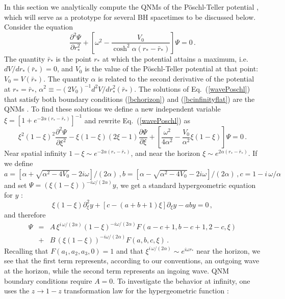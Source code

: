 \documentclass[]{iopart}
\def\be{\begin{equation}}
\def\ee{\end{equation}}
\begin{document}
In this section we analytically compute the QNMs of the P\"oschl-Teller
potential \cite{poschlteller,Ferrari:1984zz}, which will serve as a prototype
for several BH spacetimes to be discussed below. Consider the equation
%
\be \frac{\partial^{2} \Psi}{\partial r_*^2} +
\left\lbrack\omega^2-\frac{V_0}{\cosh^2{\alpha(
r_*-\bar{r}_*)}}\right\rbrack \Psi=0 \,. \label{wavePoschl} \ee
%
The quantity $\bar{r}_*$ is the point $r_*$ at which the potential attains a
maximum, i.e. $dV/dr_*(\bar{r}_*)=0$, and $V_0$ is the value of the
P\"oschl-Teller potential at that point: $V_0=V(\bar{r}_*)$. The quantity
$\alpha$ is related to the second derivative of the potential at
$r_*=\bar{r}_*$, $\alpha^2\equiv -(2V_0)^{-1} d^2V/dr_*^2(\bar{r}_*)$.
%
The solutions of Eq.~(\ref{wavePoschl}) that satisfy both boundary conditions
(\ref{bchorizon}) and (\ref{bcinfinityflat}) are the QNMs
\cite{Ferrari:1984zz}. To find these solutions we define a new independent
variable
%
$\xi=\left[1+e^{-2\alpha(r_*-\bar{r}_*)}\right]^{-1}$ and rewrite
Eq.~(\ref{wavePoschl}) as
%
\be \xi^2(1-\xi)^2\frac{\partial^{2} \Psi}{\partial
\xi^2}- \xi(1-\xi) (2\xi-1)\frac{\partial \Psi}{\partial
\xi} + \left\lbrack \frac{\omega^2}{4\alpha^2 }-\frac{V_0}{\alpha^2 }\xi (1-\xi)\right\rbrack \Psi=0
\,. \ee
%
Near spatial infinity $1-\xi \sim e^{-2\alpha(r_*-\bar{r}_*)}$, and near the
horizon $\xi \sim e^{2\alpha(r_*-\bar{r}_*)}$.
%
If we define $a=\left[\alpha+\sqrt{\alpha^2-4V_0}-2i\omega\right]/(2\alpha)
\,, b=\left[\alpha-\sqrt{\alpha^2-4V_0}-2i\omega\right]/(2\alpha)\,, c=1-
i\,\omega/\alpha $ and set $\Psi=\left (\xi(1-\xi)\right
)^{-i\omega/(2\alpha)}y$, we get a standard hypergeometric equation for $y$
\cite{Abramowitz:1970as}:
%
\be \xi(1\!-\!\xi)\partial_\xi^2 y+[c-(a+b+1)\xi]\partial_\xi y-ab
y=0\,, \ee
%
and therefore
%
\begin{eqnarray}
\Psi &=& A\, \xi^{i\,\omega/(2\alpha)}(1-\xi)^{-i\omega/(2\alpha)}
F(a-c+1,b-c+1,2-c,\xi)\nonumber \\
&+&B\,\left (\xi(1-\xi)\right )^{-i\omega/(2\alpha)}F(a,b,c,\xi) \,.
 \label{hypergeometric solution}
\end{eqnarray}
%
Recalling that $F(a_1,a_2,a_3,0)=1$ and that $\xi^{i\,\omega/(2\alpha)} \sim
e^{i\omega r_*}$ near the horizon, we see that the first term represents,
according to our conventions, an outgoing wave at the horizon, while the
second term represents an ingoing wave. QNM boundary conditions require
$A=0$. To investigate the behavior at infinity, one uses the $z \rightarrow
1-z$ transformation law for the hypergeometric function
\cite{Abramowitz:1970as}:
\end{document}
